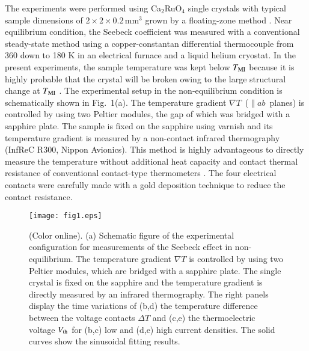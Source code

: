 \documentclass[aps,twocolumn,showpacs,preprintnumbers,amsmath,amssymb,floats,citeautoscript,nobalancelastpage]{revtex4-1}
\begin{document}
The experiments were performed using 
Ca$_2$RuO$_4$ single crystals with typical sample dimensions of $2\times2\times0.2$\,mm$^3$ grown by a floating-zone method \cite{Nakatsuji2001}. 
Near equilibrium condition,
the Seebeck coefficient was measured with a conventional steady-state method 
using a copper-constantan differential thermocouple
from 360 down to 180 K in an electrical furnace and a liquid helium cryostat.
In the present experiments, 
the sample temperature was kept below $T_{\rm MI}$
because it is highly probable that the crystal will be broken 
owing to the large structural change at $T_{\rm MI}$ \cite{Fridet2001}.
The experimental setup in the non-equilibrium condition is 
schematically shown in Fig.~1(a).
The temperature gradient $\nabla T$~($\parallel ab$~planes) is controlled by using two Peltier modules,
the gap of which was bridged with a sapphire plate.
The sample is fixed on the sapphire using varnish and its temperature gradient is 
measured by a non-contact infrared thermography (InfReC R300, Nippon Avionics).
This method is highly advantageous to directly measure the temperature 
without additional heat capacity and contact thermal resistance
of conventional contact-type thermometers \cite{Okazaki2013}. 
The four electrical contacts were carefully made with a gold deposition technique to reduce the contact resistance.

\begin{figure}[t]
\begin{center}
\texttt{[image: fig1.eps]}
\caption{(Color online).
(a) Schematic figure of the experimental configuration
for measurements of the Seebeck effect in non-equilibrium.
The temperature gradient $\nabla T$ is controlled by using two Peltier modules,
which are bridged with a sapphire plate.
The single crystal is fixed on the sapphire and the temperature gradient is directly
measured by an infrared thermography.
The right panels display the
time variations of (b,d) the temperature difference between the voltage contacts $\Delta T$ and 
(c,e) the thermoelectric voltage $V_{\rm th}$
for (b,c) low and (d,e) high current densities.
The solid curves show the sinusoidal fitting results.
}
\end{center}
\end{figure}
\end{document}

